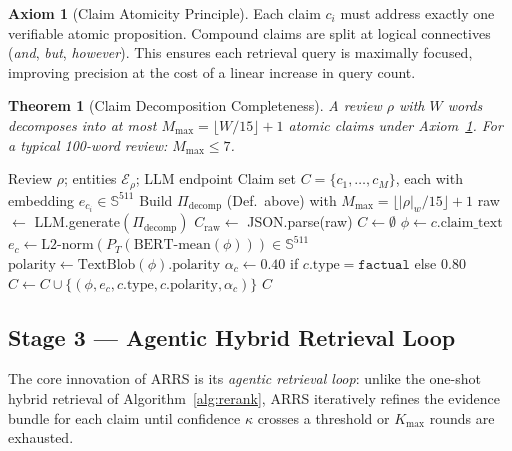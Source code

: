 \documentclass[12pt,a4paper]{article}
\theoremstyle{definition}
\newtheorem{axiom}{Axiom}[section]
\theoremstyle{plain}
\newtheorem{theorem}{Theorem}[section]
\theoremstyle{remark}
\newcommand{\Sph}{\mathbb{S}}
\begin{document}
\begin{axiom}[Claim Atomicity Principle]
\label{ax:atomicity}
Each claim $c_i$ must address exactly one verifiable atomic proposition. 
Compound claims are split at logical connectives (\emph{and}, \emph{but}, 
\emph{however}). This ensures each retrieval query is maximally focused, 
improving precision at the cost of a linear increase in query count.
\end{axiom}

\begin{theorem}[Claim Decomposition Completeness]
\label{thm:decomp_complete}
A review $\rho$ with $W$ words decomposes into at most 
$M_{\max} = \lfloor W / 15 \rfloor + 1$ atomic claims under 
Axiom~\ref{ax:atomicity}. For a typical 100-word review: $M_{\max} \le 7$.
\end{theorem}

\begin{algorithm}[H]
\caption{ARRS Stage 2 --- LLM Claim Decomposition and Classification}
\label{alg:arrs_decomp}
\begin{algorithmic}[1]
\Require Review $\rho$; entities $\mathcal{E}_\rho$; LLM endpoint
\Ensure Claim set $C = \{c_1,\ldots,c_M\}$, each with embedding $e_{c_i} \in \Sph^{511}$
\State Build $\Pi_{\text{decomp}}$ (Def.~above) with 
       $M_{\max} = \lfloor |\rho|_w / 15\rfloor + 1$
\State raw $\gets$ LLM.generate$(\Pi_{\text{decomp}})$ 
\State $C_{\text{raw}} \gets$ JSON.parse(raw) 
\State $C \gets \emptyset$
  \State $\phi \gets c.\text{claim\_text}$
  \State $e_c \gets \text{L2-norm}(P_T(\text{BERT-mean}(\phi))) \in \Sph^{511}$
  \State $\text{polarity} \gets \text{TextBlob}(\phi).\text{polarity}$
  \State $\alpha_c \gets 0.40$ if $c.\text{type} = \mathtt{factual}$ else $0.80$
  \State $C \gets C \cup \{(\phi, e_c, c.\text{type}, c.\text{polarity}, \alpha_c)\}$
\EndFor
\State \Return $C$
\end{algorithmic}
\end{algorithm}

\subsection{Stage 3 — Agentic Hybrid Retrieval Loop}
\label{sec:arrs_stage3}

The core innovation of ARRS is its \emph{agentic retrieval loop}: unlike 
the one-shot hybrid retrieval of Algorithm~\ref{alg:rerank}, ARRS 
iteratively refines the evidence bundle for each claim until confidence 
$\kappa$ crosses a threshold or $K_{\max}$ rounds are exhausted.
\end{document}
